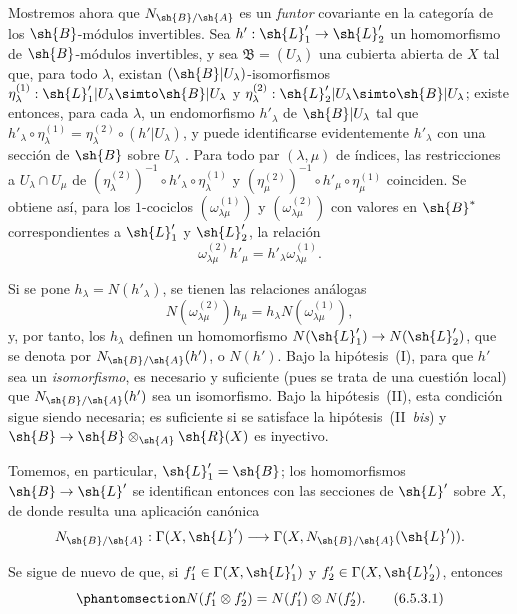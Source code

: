 \documentclass[oneside,10pt]{amsart}
\makeatletter
\newcommand{\ega@arrow}[2]{\mathchoice{#1}{#2}{#2}{#2}}
\renewcommand{\to}{\ega@arrow{\longrightarrow}{\rightarrow}}
\newcommand{\oldpage}[2][]{\marginnote{\normalfont\footnotesize\textbf{#1}~|~#2}\ignorespaces}
\let\EGAOriginalLabel\label
\renewcommand{\label}[1]{\phantomsection\EGAOriginalLabel{#1}}
\makeatother
\begin{document}
\begin{env}[6.5.3]
\label{II.6.5.3}
Mostremos ahora que $N_{\sh{B}/\sh{A}}$ es un \emph{funtor} covariante en la categoría de los $\sh{B}$-módulos invertibles.
Sea $h':\sh{L}'_1\to\sh{L}'_2$ un homomorfismo de $\sh{B}$-módulos invertibles, y sea $\mathfrak{B}=(U_\lambda)$ una cubierta abierta de $X$ tal que, para todo $\lambda$, existan $(\sh{B}|U_\lambda)$-isomorfismos $\eta_\lambda^{(1)}:\sh{L}'_1|U_\lambda\simto\sh{B}|U_\lambda$ y $\eta_\lambda^{(2)}:\sh{L}'_2|U_\lambda\simto\sh{B}|U_\lambda$;
existe entonces, para cada $\lambda$, un endomorfismo $h'_\lambda$ de $\sh{B}|U_\lambda$ tal que $h'_\lambda\circ\eta_\lambda^{(1)}=\eta_\lambda^{(2)}\circ(h'|U_\lambda)$, y puede identificarse evidentemente $h'_\lambda$ con una sección de $\sh{B}$ sobre $U_\lambda$ .
Para todo par $(\lambda,\mu)$ de índices, las restricciones a $U_\lambda\cap U_\mu$ de $(\eta_\lambda^{(2)})^{-1}\circ h'_\lambda\circ\eta_\lambda^{(1)}$ y $(\eta_\mu^{(2)})^{-1}\circ h'_\mu\circ\eta_\mu^{(1)}$ coinciden.
Se obtiene así, para los $1$-cociclos $(\omega_{\lambda\mu}^{(1)})$ y $(\omega_{\lambda\mu}^{(2)})$ con valores en $\sh{B}^*$ correspondientes a $\sh{L}'_1$ y $\sh{L}'_2$, la relación
\[
  \omega_{\lambda\mu}^{(2)}h'_\mu = h'_\lambda\omega_{\lambda\mu}^{(1)}.
\]

\oldpage[II]{128}
Si se pone $h_\lambda=N(h'_\lambda)$, se tienen las relaciones análogas
\[
  N(\omega_{\lambda\mu}^{(2)})h_\mu = h_\lambda N(\omega_{\lambda\mu}^{(1)}),
\]
y, por tanto, los $h_\lambda$ definen un homomorfismo $N(\sh{L}'_1)\to N(\sh{L}'_2)$, que se denota por $N_{\sh{B}/\sh{A}}(h')$, o $N(h')$.
Bajo la hipótesis~(I), para que $h'$ sea un \emph{isomorfismo}, es necesario y suficiente (pues se trata de una cuestión local) que $N_{\sh{B}/\sh{A}}(h')$ sea un isomorfismo.
Bajo la hipótesis~(II), esta condición sigue siendo necesaria;
es suficiente si se satisface la hipótesis~(II~\emph{bis}) y $\sh{B}\to\sh{B}\otimes_{\sh{A}}\sh{R}(X)$ es inyectivo.

Tomemos, en particular, $\sh{L}'_1=\sh{B}$;
los homomorfismos $\sh{B}\to\sh{L}'$ se identifican entonces  con las secciones de $\sh{L}'$ sobre $X$, de donde resulta una aplicación canónica
\[
  N_{\sh{B}/\sh{A}} : \Gamma(X,\sh{L}')\to\Gamma(X,N_{\sh{B}/\sh{A}}(\sh{L}')).
\]

Se sigue de nuevo de  que, si $f'_1\in\Gamma(X,\sh{L}'_1)$ y $f'_2\in\Gamma(X,\sh{L}'_2)$, entonces
\[
\label{II.6.5.3.1}
  N(f'_1\otimes f'_2) = N(f'_1)\otimes N(f'_2).
\tag{6.5.3.1}
\]


\end{env}
\end{document}
